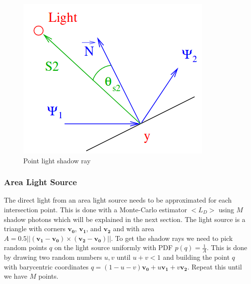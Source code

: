 \documentclass[a4paper, twocolumn]{article}
\begin{document}
            \begin{figure}[ht]
              \centering
              \includegraphics[width=\linewidth]{share/point_light.png}
              \caption{Point light shadow ray}
            \end{figure}

            \subsubsection{Area Light Source} \label{sec:area_light_source}
            The direct light from an area light source needs to be approximated for each intersection point. This is done with a Monte-Carlo estimator $<L_D>$ using $M$ shadow photons which will be explained in the next section. The light source is a triangle with corners $\mathbf{v_0}$, $\mathbf{v_1}$, and $\mathbf{v_2}$ and with area $A = 0.5 ||(\mathbf{v_1} - \mathbf{v_0})\times(\mathbf{v_2}-\mathbf{v_0})||$. To get the shadow rays we need to pick random points $q$ on the light source uniformly with PDF $p(q) = \frac{1}{A}$. This is done by drawing two random numbers $u, v$ until $u + v < 1$ and building the point $q$ with barycentric coordinates $q = (1-u-v)\mathbf{v_0} + u\mathbf{v_1} + v\mathbf{v_2}$. Repeat this until we have $M$ points. 
\end{document}
